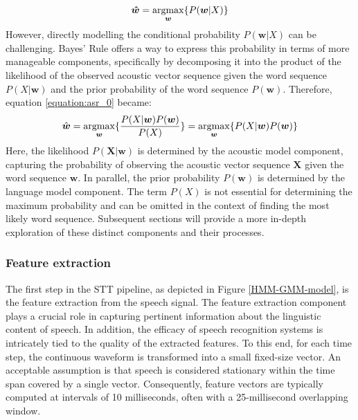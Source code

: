 \begin{equation} \label{equation:asr_0}
    \boldsymbol{\hat{w}} = \operatorname*{argmax}_{\boldsymbol{w}} \{P(\boldsymbol{w}|X)\}
\end{equation}
However, directly modelling the conditional probability $P(\boldsymbol{w}|X)$ can be challenging. Bayes' Rule offers a way to express this probability in terms of more manageable components, specifically by decomposing it into the product of the likelihood of the observed acoustic vector sequence given the word sequence $P(X|\boldsymbol{w})$ and the prior probability of the word sequence $P(\boldsymbol{w})$. Therefore, equation \ref{equation:asr_0} became:
\begin{equation}  \label{equation:asr}
    \hat{\boldsymbol{w}} = \operatorname*{argmax}_{\boldsymbol{w}} \{\frac{P(X|\boldsymbol{w})P(\boldsymbol{w})}{P(X)}\} =\operatorname*{argmax}_{\boldsymbol{w}} \{P(X|\boldsymbol{w})P(\boldsymbol{w})\}
\end{equation}
Here, the likelihood $P(\boldsymbol{X}|\boldsymbol{w})$ is determined by the acoustic model component, capturing the probability of observing the acoustic vector sequence $\boldsymbol{X}$ given the word sequence $\boldsymbol{w}$. In parallel, the prior probability $P(\boldsymbol{w})$ is determined by the language model component. The term $P(X)$ is not essential for determining the maximum probability and can be omitted in the context of finding the most likely word sequence. Subsequent sections will provide a more in-depth exploration of these distinct components and their processes.


\subsubsection{Feature extraction}%
\label{subsection:features}
The first step in the \ac{STT} pipeline, as depicted in Figure \ref{HMM-GMM-model}, is the feature extraction from the speech signal.
The feature extraction component plays a crucial role in capturing pertinent information about the linguistic content of speech. In addition, the efficacy of speech recognition systems is intricately tied to the quality of the extracted features.
To this end, for each time step, the continuous waveform is transformed into a small fixed-size vector. An acceptable assumption is that speech is considered stationary within the time span covered by a single vector. Consequently, feature vectors are typically computed at intervals of 10 milliseconds, often with a 25-millisecond overlapping window.

